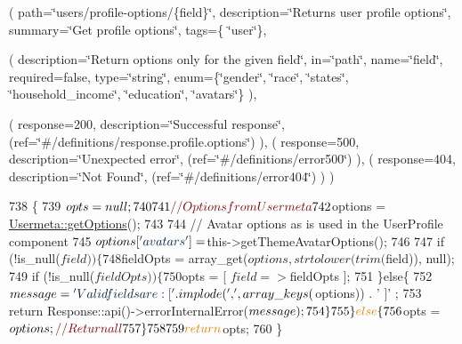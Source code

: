 ( path=\char`\"{}users/profile-\/options/\{field\}\char`\"{}, description=\char`\"{}\+Returns user profile options\char`\"{}, summary=\char`\"{}\+Get profile options\char`\"{}, tags=\{ \char`\"{}user\char`\"{}\},

( description=\char`\"{}\+Return options only for the given field\char`\"{}, in=\char`\"{}path\char`\"{}, name=\char`\"{}field\char`\"{}, required=false, type=\char`\"{}string\char`\"{}, enum=\{\char`\"{}gender\char`\"{}, \char`\"{}race\char`\"{}, \char`\"{}states\char`\"{}, \char`\"{}household\+\_\+income\char`\"{}, \char`\"{}education\char`\"{}, \char`\"{}avatars\char`\"{}\} ),

( response=200, description=\char`\"{}\+Successful response\char`\"{}, (ref=\char`\"{}\#/definitions/response.\+profile.\+options\char`\"{}) ), ( response=500, description=\char`\"{}\+Unexpected error\char`\"{}, (ref=\char`\"{}\#/definitions/error500\char`\"{}) ), ( response=404, description=\char`\"{}\+Not Found\char`\"{}, (ref=\char`\"{}\#/definitions/error404\char`\"{}) ) ) 
\begin{DoxyCode}
738     \{
739         $opts = null;
740         
741         \textcolor{comment}{// Options from Usermeta}
742         $options = \hyperlink{classDMA_1_1Friends_1_1Models_1_1Usermeta_a1acccb846d0ba68fcc9694cc0b1c4006}{Usermeta::getOptions}();
743         
744         \textcolor{comment}{// Avatar options as is used in the UserProfile component}
745         $options[\textcolor{stringliteral}{'avatars'}] = $this->getThemeAvatarOptions();
746         
747         \textcolor{keywordflow}{if} (!is\_null($field)) \{
748             $fieldOpts = array\_get($options, strtolower(trim($field)), null);
749             \textcolor{keywordflow}{if} (!is\_null($fieldOpts)) \{
750                 $opts = [ $field => $fieldOpts ];
751             \}\textcolor{keywordflow}{else}\{
752                 $message = \textcolor{stringliteral}{'Valid fields are: [ '} . implode(\textcolor{stringliteral}{', '}, array\_keys($options)) . \textcolor{stringliteral}{' ]'} ;
753                 \textcolor{keywordflow}{return} Response::api()->errorInternalError($message);
754             \}
755         \}\textcolor{keywordflow}{else}\{
756             $opts = $options; \textcolor{comment}{// Return all}
757         \}
758         
759         \textcolor{keywordflow}{return} $opts;
760     \}
\end{DoxyCode}
\hypertarget{classDMA_1_1Friends_1_1API_1_1Resources_1_1UserResource_a9d547fde7254643cdaf12cbd5aaca6b4}{}
